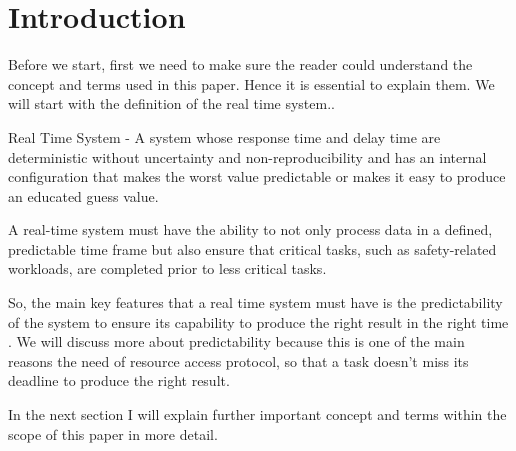 \section{Introduction}

Before we start, first we need to make sure the reader could understand the concept and terms used in this paper. Hence it is essential to explain them. We will start with the definition of the real time system..\par 

Real Time System - A system whose response time and delay time are deterministic without uncertainty and non-reproducibility and has an internal configuration that makes the worst value predictable or makes it easy to produce an educated guess value\cite{b1}.\par

A real-time system must have the ability to not only process data in a defined, predictable time frame but also ensure that critical tasks, such as safety-related workloads, are completed prior to less critical tasks\cite{b2}.

So, the main key features that a real time system must have is the predictability of the system to ensure its capability to produce the right result in the right time . We will discuss more about predictability because this is one of the main reasons the need of resource access protocol, so that a task doesn't miss its deadline to produce the right result.\par

In the next section I will explain further important concept and terms within the scope of this paper in more detail.



 
  
 
 





